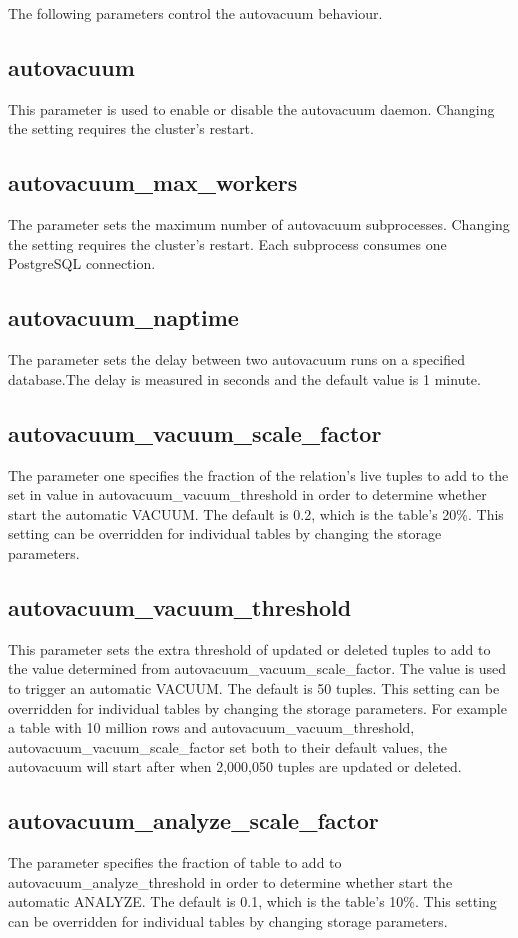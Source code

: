 The following parameters control the autovacuum behaviour.

\subsection{autovacuum} 
This parameter is used to enable or disable the autovacuum daemon. Changing the setting requires 
the cluster's restart. 

\subsection{autovacuum\_max\_workers} 
The parameter sets the maximum number of autovacuum subprocesses. Changing the setting requires the 
cluster's restart. Each subprocess consumes one PostgreSQL connection.

\subsection{autovacuum\_naptime} 
The parameter sets the delay between two autovacuum runs on a specified database.The delay is 
measured in seconds and the default value is 1 minute.

\subsection{autovacuum\_vacuum\_scale\_factor}
The parameter one specifies the fraction of the relation's live tuples to add to the set in value in 
autovacuum\_vacuum\_threshold in order to determine whether start the automatic VACUUM. The default is 0.2, 
which is the table's 20\%. This setting can be overridden for individual tables by changing the storage 
parameters.

\subsection{autovacuum\_vacuum\_threshold}
This parameter sets the extra threshold of updated or deleted tuples to add to the value determined 
from autovacuum\_vacuum\_scale\_factor. The value is used to trigger an automatic VACUUM. The default is 50 
tuples. This setting can be overridden for individual tables by changing the storage parameters. For 
example a table with 10 million rows and autovacuum\_vacuum\_threshold, autovacuum\_vacuum\_scale\_factor 
set both to their default values, the autovacuum will start after when 2,000,050 tuples are updated or 
deleted.

\subsection{autovacuum\_analyze\_scale\_factor}
The parameter specifies the fraction of table to add to autovacuum\_analyze\_threshold in order to determine 
whether start the automatic ANALYZE. The default is 0.1, which is the table's 10\%. This setting can be 
overridden for individual tables by changing storage parameters.

